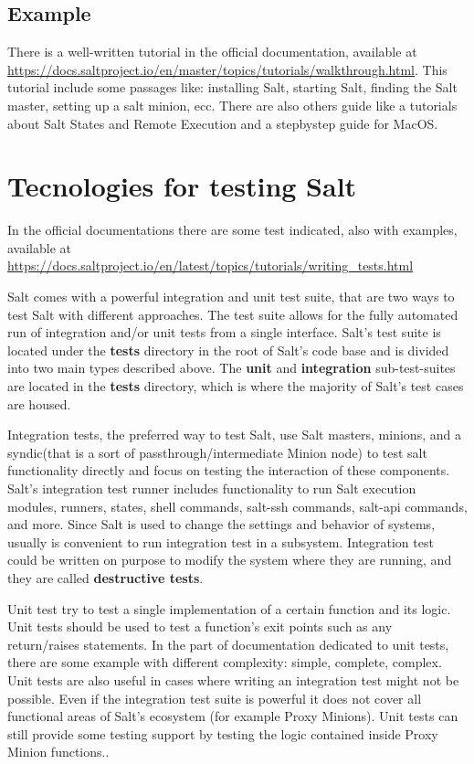 \documentclass[12pt,a4paper,openright,twoside]{book}
\begin{document}
\subsection{Example}
There is a well-written tutorial in the official documentation, available at \url{https://docs.saltproject.io/en/master/topics/tutorials/walkthrough.html}.
This tutorial include some passages like: installing Salt, starting Salt, finding the Salt master, setting up a salt minion, ecc.
There are also others guide like a tutorials about Salt States and Remote Execution and a stepbystep guide for MacOS.

\section{Tecnologies for testing Salt}
In the official documentations there are some test indicated, also with examples, available at 
\url{https://docs.saltproject.io/en/latest/topics/tutorials/writing_tests.html}


Salt comes with a powerful integration and unit test suite, that are two ways to test Salt with different approaches.
The test suite allows for the fully automated run of integration and/or unit tests from a single interface.
Salt's test suite is located under the \textbf{tests} directory in the root of Salt's code base and is divided into two main types described above.
The \textbf{unit} and \textbf{integration} sub-test-suites are located in the \textbf{tests} directory, which is where the majority of Salt's test cases are housed.\cite{saltDocTest}


Integration tests, the preferred way to test Salt, use Salt masters, minions, and a syndic(that is a sort of passthrough/intermediate Minion node) to test salt functionality directly and focus on testing the interaction of these components.
Salt's integration test runner includes functionality to run Salt execution modules, runners, states, shell commands, salt-ssh commands, salt-api commands, and more.
Since Salt is used to change the settings and behavior of systems, usually is convenient to run integration test in a subsystem.
Integration test could be written on purpose to modify the system where they are running, and they are called \textbf{destructive tests}\cite{saltDocTest}.


Unit test try to test a single implementation of a certain function and its logic. Unit tests should be used to test a function's exit points such as any return/raises statements.
In the part of documentation dedicated to unit tests, there are some example with different complexity: simple, complete, complex.
Unit tests are also useful in cases where writing an integration test might not be possible.
Even if the integration test suite is powerful it does not cover all functional areas of Salt's ecosystem (for example Proxy Minions).
Unit tests can still provide some testing support by testing the logic contained inside Proxy Minion functions.\cite{saltDocTest}.
\end{document}
